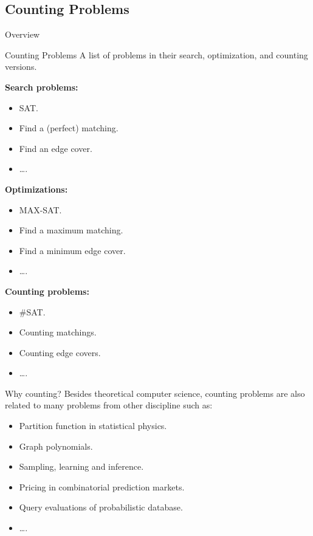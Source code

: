 \documentclass[mathserif]{beamer}
\begin{document}
\subsection{Counting Problems}
\begin{frame}{Overview}
	\tableofcontents[currentsubsection, hideothersubsections, sectionstyle=show/shaded, subsectionstyle=show/shaded]
\end{frame}
\begin{frame}{Counting Problems}
	A list of problems in their search, optimization, and counting versions.
	\bigskip

	\begin{minipage}[tb]{0.3\linewidth}
		{\bf Search problems:}
		\begin{itemize}
			\item SAT.
			\item Find a (perfect) matching.
			\item Find an edge cover.
			\item \dots.
		\end{itemize}
	\end{minipage}
	\pause
	\begin{minipage}[tb]{0.3\linewidth}
		{\bf Optimizations:}
		\begin{itemize}
			\item MAX-SAT.
			\item Find a maximum matching.
			\item Find a minimum edge cover.
			\item \dots.
		\end{itemize}
	\end{minipage}
	\pause
	\begin{minipage}[tb]{0.3\linewidth}
		{\bf Counting problems:}
		\begin{itemize}
			\item \#SAT.
			\item Counting matchings.
			\item Counting edge covers.
			\item \dots.
		\end{itemize}
	\end{minipage}
\end{frame}

\begin{frame}{Why counting?}
Besides theoretical computer science, counting problems are also related to many problems from other discipline such as:
\begin{itemize}
	\item Partition function in statistical physics.
		\pause
	\item Graph polynomials.
		\pause
	\item Sampling, learning and inference.
		\pause
    \item Pricing in combinatorial prediction markets.
	\item Query evaluations of probabilistic database.
	\item \dots.
\end{itemize}
\end{frame}
\end{document}

